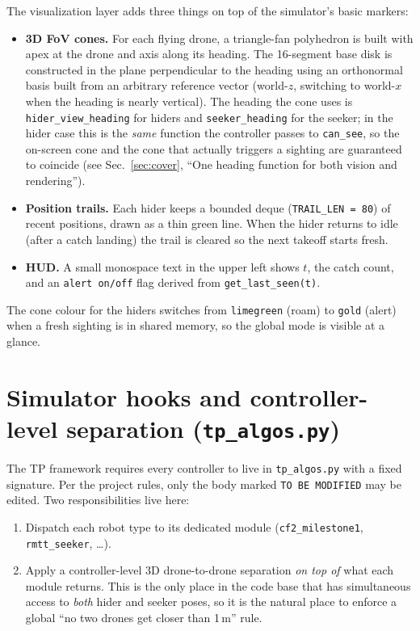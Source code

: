 \documentclass[11pt,a4paper]{article}
\newcommand{\code}[1]{\texttt{#1}}
\begin{document}
The visualization layer adds three things on top of the simulator's basic
markers:
\begin{itemize}[leftmargin=1.4em]
  \item \textbf{3D FoV cones.} For each flying drone, a triangle-fan
        polyhedron is built with apex at the drone and axis along its
        heading. The 16-segment base disk is constructed in the plane
        perpendicular to the heading using an orthonormal basis built from
        an arbitrary reference vector (world-$z$, switching to world-$x$
        when the heading is nearly vertical). The heading the cone uses is
        \code{hider\_view\_heading} for hiders and \code{seeker\_heading}
        for the seeker; in the hider case this is the \emph{same} function
        the controller passes to \code{can\_see}, so the on-screen cone and
        the cone that actually triggers a sighting are guaranteed to
        coincide (see Sec.~\ref{sec:cover}, ``One heading function for
        both vision and rendering'').
  \item \textbf{Position trails.} Each hider keeps a bounded deque
        (\code{TRAIL\_LEN = 80}) of recent positions, drawn as a thin green
        line. When the hider returns to idle (after a catch landing) the
        trail is cleared so the next takeoff starts fresh.
  \item \textbf{HUD.} A small monospace text in the upper left shows
        $t$, the catch count, and an \code{alert on/off} flag derived from
        \code{get\_last\_seen(t)}.
\end{itemize}
The cone colour for the hiders switches from \code{limegreen} (roam) to
\code{gold} (alert) when a fresh sighting is in shared memory, so the global
mode is visible at a glance.

\section{Simulator hooks and controller-level separation (\code{tp\_algos.py})}
\label{sec:tp-shim}

The TP framework requires every controller to live in \code{tp\_algos.py}
with a fixed signature. Per the project rules, only the body marked
\code{TO BE MODIFIED} may be edited. Two responsibilities live here:
\begin{enumerate}[leftmargin=1.4em]
  \item Dispatch each robot type to its dedicated module
        (\code{cf2\_milestone1}, \code{rmtt\_seeker}, \dots).
  \item Apply a controller-level 3D drone-to-drone separation \emph{on top of}
        what each module returns. This is the only place in the code base
        that has simultaneous access to \emph{both} hider and seeker poses, so
        it is the natural place to enforce a global ``no two drones get
        closer than 1\,m'' rule.
\end{enumerate}
\end{document}
